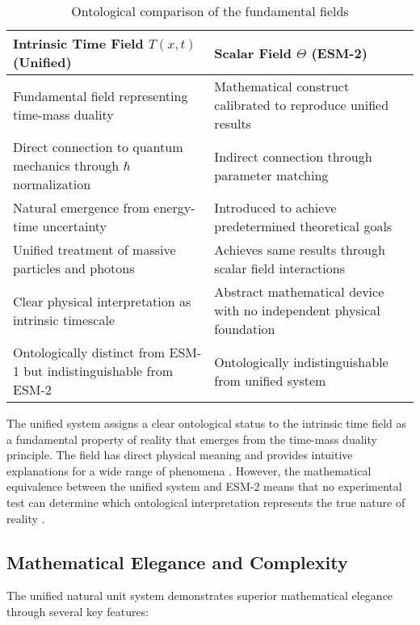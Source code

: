 \documentclass[12pt,a4paper]{article}
\newcommand{\Tfieldt}{T(x,t)}
\begin{document}
	\begin{table}[ht]
		\centering
		\caption{Ontological comparison of the fundamental fields}
		\label{tab:ontological_comparison}
		\begin{tabular}{p{}|p{}}
			\hline
			\textbf{Intrinsic Time Field $\Tfieldt$ (Unified)} & \textbf{Scalar Field $\Theta$ (ESM-2)} \\
			\hline
			Fundamental field representing time-mass duality \cite{pascher_lagrangian_2025} & Mathematical construct calibrated to reproduce unified results \\
			\hline
			Direct connection to quantum mechanics through $\hbar$ normalization & Indirect connection through parameter matching \\
			\hline
			Natural emergence from energy-time uncertainty & Introduced to achieve predetermined theoretical goals \\
			\hline
			Unified treatment of massive particles and photons & Achieves same results through scalar field interactions \\
			\hline
			Clear physical interpretation as intrinsic timescale & Abstract mathematical device with no independent physical foundation \\
			\hline
			Ontologically distinct from ESM-1 but indistinguishable from ESM-2 \cite{vanFraassen1980} & Ontologically indistinguishable from unified system \\
			\hline
		\end{tabular}
	\end{table}
	
	The unified system assigns a clear ontological status to the intrinsic time field as a fundamental property of reality that emerges from the time-mass duality principle. The field has direct physical meaning and provides intuitive explanations for a wide range of phenomena \cite{pascher_pragmatic_2025}. However, the mathematical equivalence between the unified system and ESM-2 means that no experimental test can determine which ontological interpretation represents the true nature of reality \cite{Poincare1905}.
	
	\subsection{Mathematical Elegance and Complexity}
	\label{subsec:mathematical_elegance}
	
	The unified natural unit system demonstrates superior mathematical elegance through several key features:
	
\end{document}
